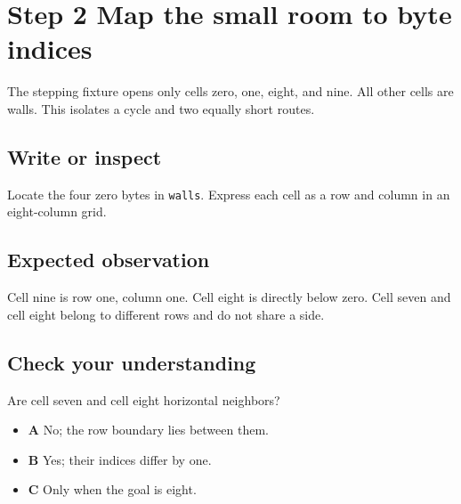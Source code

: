 \section{Step 2 Map the small room to byte indices}\label{maze-s02}

The stepping fixture opens only cells zero, one, eight, and nine. All other cells are walls. This isolates a cycle and two equally short routes.

\subsection{Write or inspect}

Locate the four zero bytes in \texttt{walls}. Express each cell as a row and column in an eight-column grid.

\subsection{Expected observation}

Cell nine is row one, column one. Cell eight is directly below zero. Cell seven and cell eight belong to different rows and do not share a side.

\subsection{Check your understanding}

Are cell seven and cell eight horizontal neighbors?

\begin{itemize}
  \item \textbf{A} No; the row boundary lies between them.
  \item \textbf{B} Yes; their indices differ by one.
  \item \textbf{C} Only when the goal is eight.
\end{itemize}
